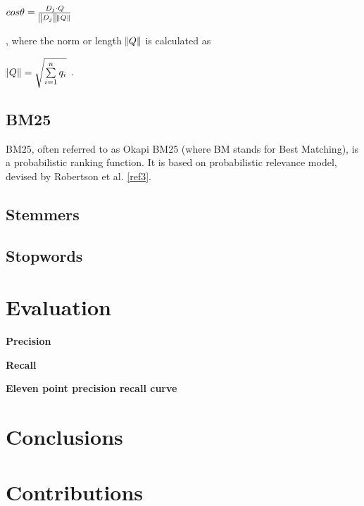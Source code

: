 \begin{center}
$ cos\theta = \frac{D_j \cdot Q}{\norm{D_j} \norm{Q}} $ 
\end{center} 
, where the norm or length $ \norm{Q}$ is calculated as
\begin{center}
$ \norm{Q} = \sqrt{\sum\limits_{i=1}^n q_i } $ .
\end{center}


\subsection{BM25}

BM25, often referred to as Okapi BM25 (where BM stands for Best Matching), is a probabilistic ranking function. It is based on probabilistic relevance model, devised by Robertson et al. \ref{ref3}.




\subsection{Stemmers}
\subsection{Stopwords}


\section{Evaluation}


\textbf{Precision}

\textbf{Recall}

\textbf{Eleven point precision recall curve}


\section{Conclusions}


\section{Contributions}


